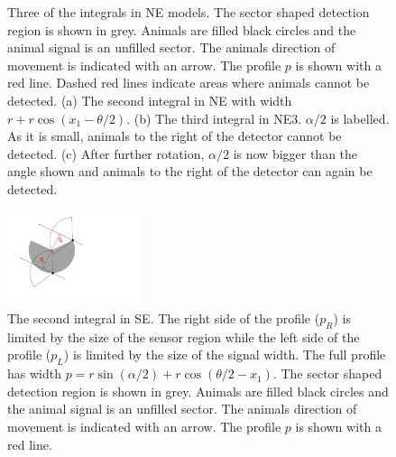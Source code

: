 \begin{figure}[t]
  \centering
{
}
\caption[Three of the integrals in NE models]{
Three of the integrals in NE models. 
The sector shaped detection region is shown in grey. 
Animals are filled black circles and the animal signal is an unfilled sector. 
The animals direction of movement is indicated with an arrow. 
The profile $p$ is shown with a red line. 
Dashed red lines indicate areas where animals cannot be detected. 
(a) The second integral in NE with width $r + r\cos(x_1 - \theta/2)$. 
(b) The third integral in NE3. $\alpha/2$ is labelled. 
As it is small, animals to the right of the detector cannot be detected. 
(c) After further rotation, $\alpha/2$ is now bigger than the angle shown and animals to the right of the detector can again be detected.
}
\label{f:NE}
\end{figure}


\begin{figure}[t]
        \centering
        \includegraphics[width=0.35\textwidth, trim=1cm 4cm 9cm 1cm]{imgs/se3.pdf}
\caption[The second integral in SE]{The second integral in SE. The right side of the profile ($p_R$) is limited by the size of the sensor region  while the left side of the profile ($p_L$) is limited by the size of the signal width. The full profile has width $p = r\sin(\alpha/2) +r\cos(\theta/2-x_1)$. The sector shaped detection region is shown in grey. Animals are filled black circles and the animal signal is an unfilled sector. The animals direction of movement is indicated with an arrow. The profile $p$ is shown with a red line.   }
\label{f:se3}
\end{figure}

